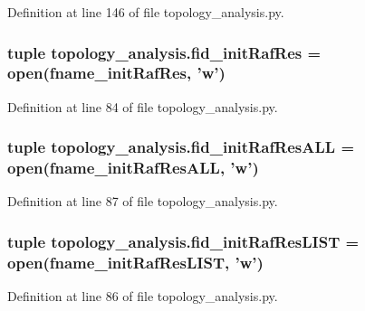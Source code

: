 Definition at line 146 of file topology\-\_\-analysis.\-py.

\hypertarget{a00157_aa47d62b7ce95f5c4e730d081209770c2}{
\subsubsection[{fid\-\_\-init\-Raf\-Res}]{\setlength{\rightskip}{0pt plus 5cm}tuple topology\-\_\-analysis.\-fid\-\_\-init\-Raf\-Res = open({\bf fname\-\_\-init\-Raf\-Res}, 'w')}}\label{a00157_aa47d62b7ce95f5c4e730d081209770c2}


Definition at line 84 of file topology\-\_\-analysis.\-py.

\hypertarget{a00157_afcacf140d9efed55635e8dcd084db870}{
\subsubsection[{fid\-\_\-init\-Raf\-Res\-A\-L\-L}]{\setlength{\rightskip}{0pt plus 5cm}tuple topology\-\_\-analysis.\-fid\-\_\-init\-Raf\-Res\-A\-L\-L = open({\bf fname\-\_\-init\-Raf\-Res\-A\-L\-L}, 'w')}}\label{a00157_afcacf140d9efed55635e8dcd084db870}


Definition at line 87 of file topology\-\_\-analysis.\-py.

\hypertarget{a00157_abca13a03834449d5629252329999f1a3}{
\subsubsection[{fid\-\_\-init\-Raf\-Res\-L\-I\-S\-T}]{\setlength{\rightskip}{0pt plus 5cm}tuple topology\-\_\-analysis.\-fid\-\_\-init\-Raf\-Res\-L\-I\-S\-T = open({\bf fname\-\_\-init\-Raf\-Res\-L\-I\-S\-T}, 'w')}}\label{a00157_abca13a03834449d5629252329999f1a3}


Definition at line 86 of file topology\-\_\-analysis.\-py.

